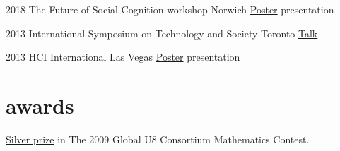 \documentclass[]{friggeri-cv}
\begin{document}
\begin{entrylist}

    \entry
    {2018}
    {The Future of Social Cognition workshop}
    {Norwich}
    {\href{http://www.tomgurion.me/pdfs/FoSC2018 poster.pdf}{Poster} presentation}

\end{entrylist}
\begin{entrylist}

    \entry
    {2013}
    {International Symposium on Technology and Society}
    {Toronto}
    {\href{http://www.slideshare.net/Nagasaki45/audioonly-augmented-reality-system-for-social-interaction}{Talk}}

\end{entrylist}
\begin{entrylist}

    \entry
    {2013}
    {HCI International}
    {Las Vegas}
    {\href{http://www.tomgurion.me/pdfs/HCI2013 poster.pdf}{Poster} presentation}

\end{entrylist}



\section{awards}

\href{http://www.tomgurion.me/pdfs/U8 mathematic contest - silver prize.pdf}{Silver prize} in The 2009 Global U8 Consortium Mathematics Contest.
\end{document}
